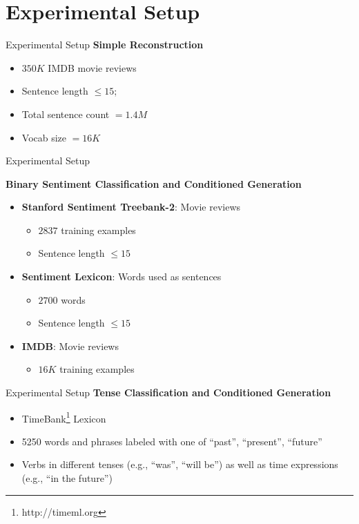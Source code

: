 \documentclass{beamer}
\begin{document}
\section{Experimental Setup}
\begin{frame}{Experimental Setup}
	\textbf{Simple Reconstruction}
	\begin{itemize}
		\item $350K$ IMDB movie reviews
		\item Sentence length $\leq 15$;
		\item Total sentence count $= 1.4M$
		\item Vocab size $= 16K$
	\end{itemize}
\end{frame}

\begin{frame}{Experimental Setup}

	\textbf{Binary Sentiment Classification and Conditioned Generation}

	\begin{itemize}
		\item \textbf{Stanford Sentiment Treebank-2}: Movie reviews
		      \begin{itemize}
			      \item $2837$ training examples
			      \item Sentence length $\leq 15$
		      \end{itemize}
		\item \textbf{Sentiment Lexicon}: Words used as sentences
		      \begin{itemize}
			      \item $2700$ words
			      \item Sentence length $\leq 15$
		      \end{itemize}
		\item \textbf{IMDB}: Movie reviews
		      \begin{itemize}
			      \item $16K$ training examples
		      \end{itemize}
	\end{itemize}
\end{frame}

\begin{frame}{Experimental Setup}
	\textbf{Tense Classification and Conditioned Generation}
	\begin{itemize}
		\item TimeBank\footnote{http://timeml.org} Lexicon
		\item 5250 words and phrases labeled with one of {“past”, “present”, “future”}
		\item Verbs in different tenses (e.g., “was”, “will be”) as well as time expressions (e.g., “in the future”)
	\end{itemize}
\end{frame}
\end{document}
